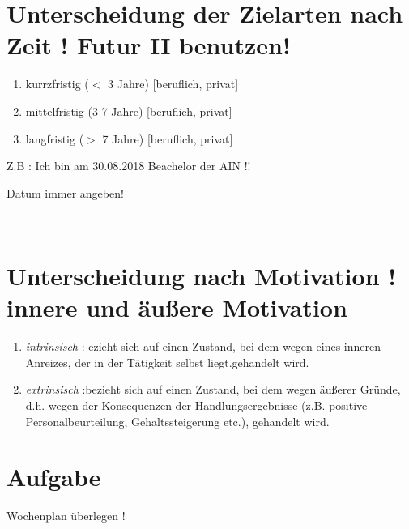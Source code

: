 \documentclass[11pt,a4paper]{article}
\begin{document}
\section*{Unterscheidung der Zielarten nach Zeit ! \tiny{Futur II benutzen!}}
\begin{enumerate}
\item kurrzfristig ($<$ 3 Jahre) [beruflich, privat]
\item mittelfristig (3-7 Jahre) [beruflich, privat]
\item langfristig ($>$ 7 Jahre) [beruflich, privat]
\end{enumerate}
Z.B : Ich bin am 30.08.2018 Beachelor der AIN !!
\begin{tiny}
 \tiny{Datum immer angeben!} 
\end{tiny}\\

 \section*{Unterscheidung nach Motivation ! \tiny{innere und äußere Motivation} }
 \begin{enumerate}
 \item \textit{intrinsisch} : ezieht sich auf einen Zustand, bei dem wegen eines inneren Anreizes, der in der Tätigkeit selbst liegt.gehandelt wird.
 \item \textit{extrinsisch} :bezieht sich auf einen Zustand, bei dem wegen äußerer Gründe, d.h. wegen der Konsequenzen der Handlungsergebnisse (z.B. positive Personalbeurteilung, Gehaltssteigerung etc.), gehandelt wird.
 \end{enumerate}

\section*{Aufgabe}
Wochenplan überlegen !
\end{document}
